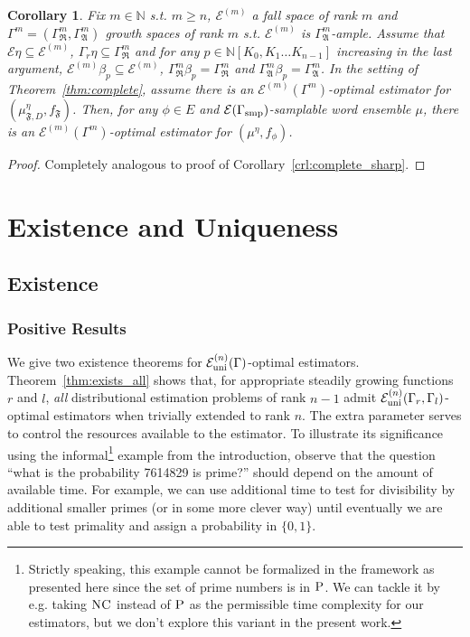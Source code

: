 \documentclass{article}
\numberwithin{equation}{section}
\theoremstyle{definition}
\theoremstyle{plain}
\newtheorem{corollary}{Corollary}[section]
\newcommand{\Nats}{\mathbb{N}}
\newcommand{\NatPoly}{\Nats[K_0, K_1 \ldots K_{n-1}]}
\newcommand{\GrowR}{\Gamma_{\mathfrak{R}}}
\newcommand{\GrowA}{\Gamma_{\mathfrak{A}}}
\newcommand{\Fall}{\mathcal{E}}
\newcommand{\FallU}{{\Fall_{\textnormal{uni}}^{(n)}}}
\begin{document}
\begin{samepage}
\begin{corollary}

Fix ${m \in \Nats}$ s.t. ${m \geq n}$, ${\Fall^{(m)}}$ a fall space of rank ${m}$ and ${\Gamma^m=(\GrowR^m, \GrowA^m)}$ growth spaces of rank ${m}$ s.t. ${\Fall^{(m)}}$ is ${\GrowA^m}$-ample. Assume that ${\Fall \eta \subseteq \Fall^{(m)}}$, ${\Gamma_r \eta \subseteq \GrowR^{m}}$ and for any ${p \in \NatPoly}$ increasing in the last argument, ${\Fall^{(m)} \beta_p \subseteq \Fall^{(m)}}$, ${\GrowR^m \beta_p = \GrowR^m}$ and ${\GrowA^m \beta_p = \GrowA^m}$. In the setting of Theorem~\ref{thm:complete}, assume there is an ${\Fall^{(m)}(\Gamma^m)}$-optimal estimator for ${(\mu_{\mathfrak{F},D}^\eta,f_{\mathfrak{F}})}$. Then, for any ${\phi \in E}$ and ${\Fall(\Gamma_{\textnormal{smp}})}$-samplable word ensemble ${\mu}$, there is an ${\Fall^{(m)}(\Gamma^m)}$-optimal estimator for ${(\mu^\eta,f_\phi)}$.
\end{corollary}
\end{samepage}

\begin{proof}

Completely analogous to proof of Corollary~\ref{crl:complete_sharp}.
%
\end{proof}

\section{Existence and Uniqueness}
\label{sec:e_and_u}

\subsection{Existence}

\subsubsection{Positive Results}

We give two existence theorems for ${\FallU(\Gamma)}$-optimal estimators. Theorem~\ref{thm:exists_all} shows that, for appropriate steadily growing functions ${r}$ and ${l}$, \emph{all} distributional estimation problems of rank ${n-1}$ admit ${\FallU(\Gamma_r,\Gamma_l)}$-optimal estimators when trivially extended to rank ${n}$. The extra parameter serves to control the resources available to the estimator. To illustrate its significance using the informal\footnote{Strictly speaking, this example cannot be formalized in the framework as presented here since the set of prime numbers is in $\textsc{P}$. We can tackle it by e.g. taking ${\textsc{NC}}$ instead of ${\textsc{P}}$ as the permissible time complexity for our estimators, but we don't explore this variant in the present work.} example from the introduction, observe that the question \enquote{what is the probability 7614829 is prime?} should depend on the amount of available time. For example, we can use additional time to test for divisibility by additional smaller primes (or in some more clever way) until eventually we are able to test primality and assign a probability in $\{0,1\}$. 
\end{document}
